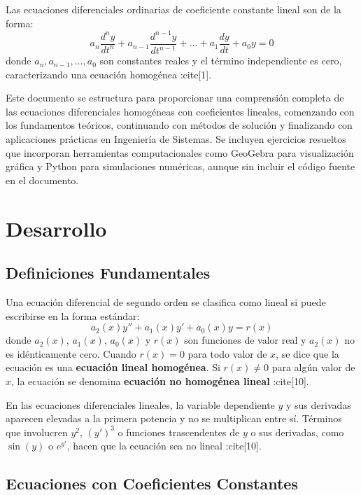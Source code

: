 \documentclass[12pt,a4paper]{article}
\begin{document}
Las ecuaciones diferenciales ordinarias de coeficiente constante lineal son de la forma:
\begin{equation}
a_n \frac{d^n y}{dt^n} + a_{n-1} \frac{d^{n-1} y}{dt^{n-1}} + \ldots + a_1 \frac{dy}{dt} + a_0 y = 0
\end{equation}
donde $a_n, a_{n-1}, \ldots, a_0$ son constantes reales y el término independiente es cero, caracterizando una ecuación homogénea :cite[1].

Este documento se estructura para proporcionar una comprensión completa de las ecuaciones diferenciales homogéneas con coeficientes lineales, comenzando con los fundamentos teóricos, continuando con métodos de solución y finalizando con aplicaciones prácticas en Ingeniería de Sistemas. Se incluyen ejercicios resueltos que incorporan herramientas computacionales como GeoGebra para visualización gráfica y Python para simulaciones numéricas, aunque sin incluir el código fuente en el documento.

\section{Desarrollo}

\subsection{Definiciones Fundamentales}

Una ecuación diferencial de segundo orden se clasifica como lineal si puede escribirse en la forma estándar:
\begin{equation}
a_2(x)y'' + a_1(x)y' + a_0(x)y = r(x)
\end{equation}
donde $a_2(x)$, $a_1(x)$, $a_0(x)$ y $r(x)$ son funciones de valor real y $a_2(x)$ no es idénticamente cero. Cuando $r(x) = 0$ para todo valor de $x$, se dice que la ecuación es una \textbf{ecuación lineal homogénea}. Si $r(x) \neq 0$ para algún valor de $x$, la ecuación se denomina \textbf{ecuación no homogénea lineal} :cite[10].

En las ecuaciones diferenciales lineales, la variable dependiente $y$ y sus derivadas aparecen elevadas a la primera potencia y no se multiplican entre sí. Términos que involucren $y^2$, $(y')^3$ o funciones trascendentes de $y$ o sus derivadas, como $\sin(y)$ o $e^{y'}$, hacen que la ecuación sea no lineal :cite[10].

\subsection{Ecuaciones con Coeficientes Constantes}
\end{document}
